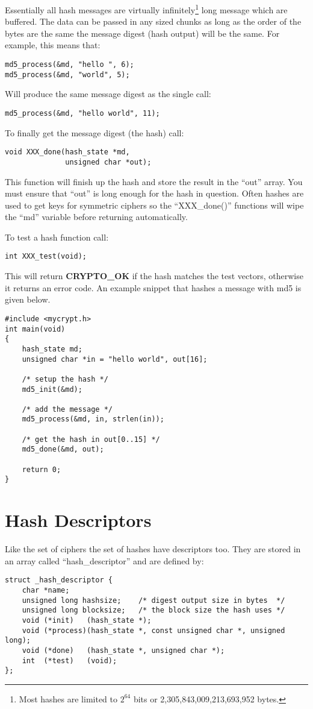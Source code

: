 \documentclass{book}
\begin{document}
Essentially all hash messages are virtually infinitely\footnote{Most hashes are limited to $2^{64}$ bits or 2,305,843,009,213,693,952 bytes.} long message which 
are buffered.  The data can be passed in any sized chunks as long as the order of the bytes are the same the message digest
(hash output) will be the same.  For example, this means that:
\begin{verbatim}
md5_process(&md, "hello ", 6);
md5_process(&md, "world", 5);
\end{verbatim}
Will produce the same message digest as the single call:
\begin{verbatim}
md5_process(&md, "hello world", 11);
\end{verbatim}

To finally get the message digest (the hash) call:
\begin{verbatim}
void XXX_done(hash_state *md, 
              unsigned char *out);
\end{verbatim}

This function will finish up the hash and store the result in the ``out'' array.  You must ensure that ``out'' is long
enough for the hash in question.  Often hashes are used to get keys for symmetric ciphers so the ``XXX\_done()'' functions
will wipe the ``md'' variable before returning automatically.

To test a hash function call:
\begin{verbatim}
int XXX_test(void);
\end{verbatim}

This will return {\bf CRYPTO\_OK} if the hash matches the test vectors, otherwise it returns an error code.  An
example snippet that hashes a message with md5 is given below.
\begin{small}
\begin{verbatim}
#include <mycrypt.h>
int main(void)
{
    hash_state md;
    unsigned char *in = "hello world", out[16];

    /* setup the hash */
    md5_init(&md);

    /* add the message */
    md5_process(&md, in, strlen(in));

    /* get the hash in out[0..15] */
    md5_done(&md, out);

    return 0;
}
\end{verbatim}
\end{small}

\section{Hash Descriptors}
Like the set of ciphers the set of hashes have descriptors too.  They are stored in an array called ``hash\_descriptor'' and
are defined by:
\begin{verbatim}
struct _hash_descriptor {
    char *name;
    unsigned long hashsize;    /* digest output size in bytes  */
    unsigned long blocksize;   /* the block size the hash uses */
    void (*init)   (hash_state *);
    void (*process)(hash_state *, const unsigned char *, unsigned long);
    void (*done)   (hash_state *, unsigned char *);
    int  (*test)   (void);
};
\end{verbatim}
\end{document}
